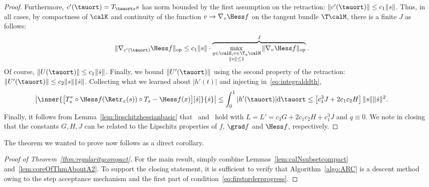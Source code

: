 \begin{proof}
	Furthermore, $c'(\tauort) = T_{\tauort s} s$ has norm bounded by the first assumption on the retraction: $\|c'(\tauort)\| \leq c_1 \|s\|$. Thus, in all cases, by compactness of $\calK$ and continuity of the function $v \to \nabla_v \Hess f$ on the tangent bundle $\T\calM$, there is a finite $J$ as follows: %
	\begin{align*}
		\|\nabla_{c'(\tauort)} \Hess f \|_{\mathrm{op}} & \leq c_1 \|s\| \cdot \overbrace{\max_{\substack{y \in \calK, v \in \T_y\calM \\ \|v\| \leq 1}} \| \nabla_v \Hess f \|_{\mathrm{op}}}^{J}.
	\end{align*}
	Of course, $\|U(\tauort)\| \leq c_1 \|\dot s\|$. Finally, we bound $\|U'(\tauort)\|$ using the second property of the retraction: $\|U'(\tauort)\| \leq c_2\|s\| \|\dot s\|$. Collecting what we learned about $|h'(t)|$ and injecting in~\eqref{eq:integralddth},
	\begin{align*}
		\left|\inner{\big[T_s^* \circ \Hess f(\Retr_x(s)) \circ T_s - \Hess f(x)\big][\dot s]}{\dot s}\right| & \leq \int_{0}^{1} |h'(\tauort)| \mathrm{d}\tauort \leq \left[ c_1^3 J + 2 c_1 c_2 H \right] \|s\| \|\dot s\|^2.
	\end{align*}
	Finally, it follows from Lemma~\ref{lem:lipschitzhessianbasic} that~ and~ hold with $L = L' = c_3G + 2 c_1 c_2 H + c_1^3 J$ and $q \equiv 0$. We note in closing that the constants $G, H, J$ can be related to the Lipschitz properties of $f$, $\grad f$ and $\Hess f$, respectively.
\end{proof}
The theorem we wanted to prove now follows as a direct corollary.
\begin{proof}[Proof of Theorem~\ref{thm:regularitycompact}]
	For the main result, simply combine Lemmas~\ref{lem:calNsubsetcompact} and~\ref{lem:coreOfThmAboutA2}. To support the closing statement, it is sufficient to verify that Algorithm~\ref{algo:ARC} is a descent method
	owing to the step acceptance mechanism and the first part of condition~\eqref{eq:firstorderprogress}.
\end{proof}

